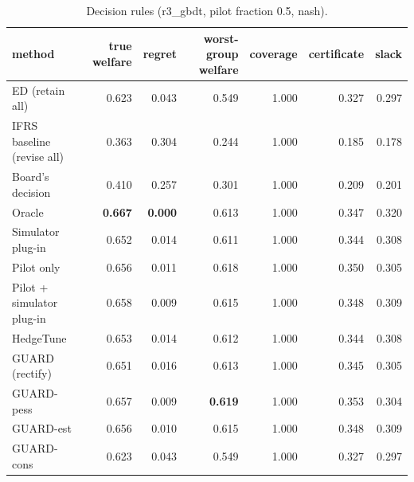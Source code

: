 \begin{table}[t]
\centering
\small
\begin{tabular}{lrrrrrr}
\toprule
method & true welfare & regret & worst-group welfare & coverage & certificate & slack \\
\midrule
ED (retain all) & 0.623 & 0.043 & 0.549 & 1.000 & 0.327 & 0.297 \\
IFRS baseline (revise all) & 0.363 & 0.304 & 0.244 & 1.000 & 0.185 & 0.178 \\
Board's decision & 0.410 & 0.257 & 0.301 & 1.000 & 0.209 & 0.201 \\
Oracle & \textbf{0.667} & \textbf{0.000} & 0.613 & 1.000 & 0.347 & 0.320 \\
Simulator plug-in & 0.652 & 0.014 & 0.611 & 1.000 & 0.344 & 0.308 \\
Pilot only & 0.656 & 0.011 & 0.618 & 1.000 & 0.350 & 0.305 \\
Pilot + simulator plug-in & 0.658 & 0.009 & 0.615 & 1.000 & 0.348 & 0.309 \\
HedgeTune & 0.653 & 0.014 & 0.612 & 1.000 & 0.344 & 0.308 \\
GUARD (rectify) & 0.651 & 0.016 & 0.613 & 1.000 & 0.345 & 0.305 \\
GUARD-pess & 0.657 & 0.009 & \textbf{0.619} & 1.000 & 0.353 & 0.304 \\
GUARD-est & 0.656 & 0.010 & 0.615 & 1.000 & 0.348 & 0.309 \\
GUARD-cons & 0.623 & 0.043 & 0.549 & 1.000 & 0.327 & 0.297 \\
\bottomrule
\end{tabular}
\caption{Decision rules (r3\_gbdt, pilot fraction 0.5, nash).}
\label{tab:methods-nash}
\end{table}

